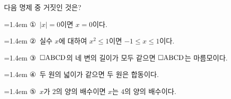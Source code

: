 다음 명제 중 거짓인 것은?
\par\medskip\par\noindent\hangindent=1.4em {\small ①}\ $|x|=0$이면 $x=0$이다.\par\noindent\hangindent=1.4em {\small ②}\ 실수 $x$에 대하여 $x^2\le 1$이면 $-1\le x\le 1$이다.\par\noindent\hangindent=1.4em {\small ③}\ $\square\mathrm{ABCD}$의 네 변의 길이가 모두 같으면 $\square\mathrm{ABCD}$는 마름모이다.\par\noindent\hangindent=1.4em {\small ④}\ 두 원의 넓이가 같으면 두 원은 합동이다.\par\noindent\hangindent=1.4em {\small ⑤}\ $x$가 $2$의 양의 배수이면 $x$는 $4$의 양의 배수이다.\par\medskip

